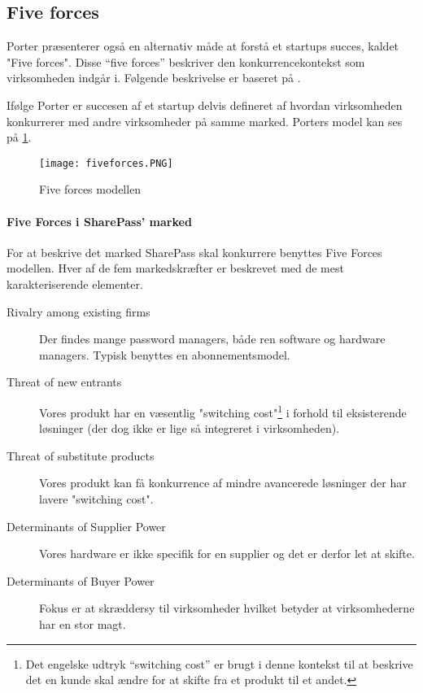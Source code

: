 \subsection{Five forces}
 Porter præsenterer også en alternativ måde at forstå et startups succes, kaldet "Five forces".
 Disse ``five forces'' beskriver den konkurrencekontekst som virksomheden indgår i.
 Følgende beskrivelse er baseret på \citet[p.~16]{rose2012software}.

 Ifølge Porter er succesen af et startup delvis defineret af hvordan virksomheden konkurrerer med andre virksomheder på samme marked.
 Porters model kan ses på \cref{fiveforces}.

\begin{figure}[H]
	\texttt{[image: fiveforces.PNG]}
	\caption{Five forces modellen}
	\label{fiveforces}
\end{figure}

\paragraph{Five Forces i SharePass' marked}
\label{par:five_forces_i_sharepass_marked}

For at beskrive det marked SharePass skal konkurrere benyttes Five Forces modellen. 
Hver af de fem markedskræfter er beskrevet med de mest karakteriserende elementer.

\begin{description}
	\item[Rivalry among existing firms] Der findes mange password managers, både ren software og hardware managers. Typisk benyttes en abonnementsmodel.
	\item[Threat of new entrants] Vores produkt har en væsentlig "switching cost"\footnote{Det engelske udtryk ``switching cost'' er brugt i denne kontekst til at beskrive det en kunde skal ændre for at skifte fra et produkt til et andet.}  i forhold til eksisterende løsninger (der dog ikke er lige så integreret i virksomheden). 
	\item [Threat of substitute products] Vores produkt kan få konkurrence af mindre avancerede løsninger der har lavere "switching cost".
	\item [Determinants of Supplier Power] Vores hardware er ikke specifik for en supplier og det er derfor let at skifte. 
	\item [Determinants of Buyer Power] Fokus er at skræddersy til virksomheder hvilket betyder at virksomhederne har en stor magt.
\end{description}
